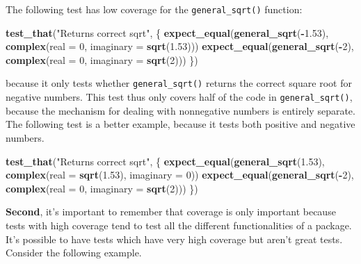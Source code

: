 \documentclass[]{book}
\newenvironment{Shaded}{\begin{snugshade}}{\end{snugshade}}
\newcommand{\KeywordTok}[1]{\textcolor[rgb]{0.13,0.29,0.53}{\textbf{#1}}}
\newcommand{\DataTypeTok}[1]{\textcolor[rgb]{0.13,0.29,0.53}{#1}}
\newcommand{\DecValTok}[1]{\textcolor[rgb]{0.00,0.00,0.81}{#1}}
\newcommand{\FloatTok}[1]{\textcolor[rgb]{0.00,0.00,0.81}{#1}}
\newcommand{\StringTok}[1]{\textcolor[rgb]{0.31,0.60,0.02}{#1}}
\newcommand{\OperatorTok}[1]{\textcolor[rgb]{0.81,0.36,0.00}{\textbf{#1}}}
\newcommand{\NormalTok}[1]{#1}
\begin{document}
The following test has low coverage for the \texttt{general\_sqrt()}
function:

\begin{Shaded}
\begin{Highlighting}[]
\KeywordTok{test_that}\NormalTok{(}\StringTok{"Returns correct sqrt"}\NormalTok{, \{}
  \KeywordTok{expect_equal}\NormalTok{(}\KeywordTok{general_sqrt}\NormalTok{(}\OperatorTok{-}\FloatTok{1.53}\NormalTok{), }\KeywordTok{complex}\NormalTok{(}\DataTypeTok{real =} \DecValTok{0}\NormalTok{, }\DataTypeTok{imaginary =} \KeywordTok{sqrt}\NormalTok{(}\FloatTok{1.53}\NormalTok{)))}
  \KeywordTok{expect_equal}\NormalTok{(}\KeywordTok{general_sqrt}\NormalTok{(}\OperatorTok{-}\DecValTok{2}\NormalTok{), }\KeywordTok{complex}\NormalTok{(}\DataTypeTok{real =} \DecValTok{0}\NormalTok{, }\DataTypeTok{imaginary =} \KeywordTok{sqrt}\NormalTok{(}\DecValTok{2}\NormalTok{)))}
\NormalTok{\})}
\end{Highlighting}
\end{Shaded}

because it only tests whether \texttt{general\_sqrt()} returns the
correct square root for negative numbers. This test thus only covers
half of the code in \texttt{general\_sqrt()}, because the mechanism for
dealing with nonnegative numbers is entirely separate. The following
test is a better example, because it tests both positive and negative
numbers.

\begin{Shaded}
\begin{Highlighting}[]
\KeywordTok{test_that}\NormalTok{(}\StringTok{"Returns correct sqrt"}\NormalTok{, \{}
  \KeywordTok{expect_equal}\NormalTok{(}\KeywordTok{general_sqrt}\NormalTok{(}\FloatTok{1.53}\NormalTok{), }\KeywordTok{complex}\NormalTok{(}\DataTypeTok{real =} \KeywordTok{sqrt}\NormalTok{(}\FloatTok{1.53}\NormalTok{), }\DataTypeTok{imaginary =} \DecValTok{0}\NormalTok{))}
  \KeywordTok{expect_equal}\NormalTok{(}\KeywordTok{general_sqrt}\NormalTok{(}\OperatorTok{-}\DecValTok{2}\NormalTok{), }\KeywordTok{complex}\NormalTok{(}\DataTypeTok{real =} \DecValTok{0}\NormalTok{, }\DataTypeTok{imaginary =} \KeywordTok{sqrt}\NormalTok{(}\DecValTok{2}\NormalTok{)))}
\NormalTok{\})}
\end{Highlighting}
\end{Shaded}

\textbf{Second}, it's important to remember that coverage is only
important because tests with high coverage tend to test all the
different functionalities of a package. It's possible to have tests
which have very high coverage but aren't great tests. Consider the
following example.
\end{document}

